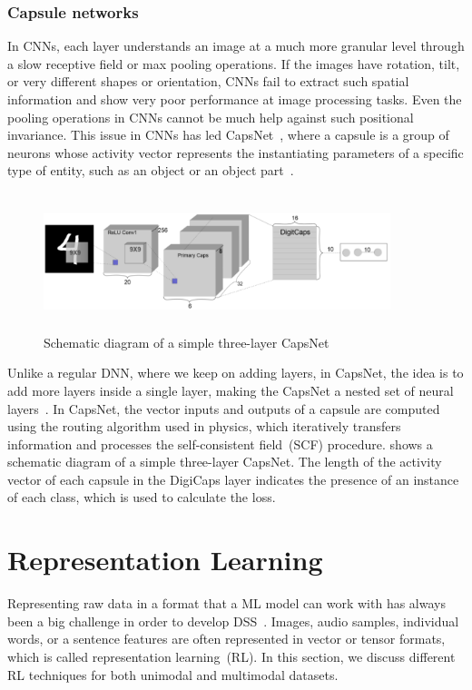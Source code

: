 \subsubsection{Capsule networks}
In CNNs, each layer understands an image at a much more granular level through a slow receptive field or max pooling operations. If the images have rotation, tilt, or very different shapes or orientation, CNNs fail to extract such spatial information and show very poor performance at image processing tasks. Even the pooling operations in CNNs cannot be much help against such positional invariance. This issue in CNNs has led CapsNet~\cite{CapsNet}, where a capsule is a group of neurons whose activity vector represents the instantiating parameters of a specific type of entity, such as an object or an object part~\cite{CapsNet}.

\begin{figure}[h]
    \centering
    \includegraphics[width=0.9\textwidth,height=40mm]{images/capsnet.png}
    \caption{Schematic diagram of a simple three-layer CapsNet~\cite{karimDLTF2018}}
    \label{fig:capsnet}
\end{figure}

\hspace*{3.5mm} Unlike a regular DNN, where we keep on adding layers, in CapsNet, the idea is to add more layers inside a single layer, making the CapsNet a nested set of neural layers~\cite{CapsNet}. In CapsNet, the vector inputs and outputs of a capsule are computed using the routing algorithm used in physics, which iteratively transfers information and processes the self-consistent field~(SCF) procedure.  shows a schematic diagram of a simple three-layer CapsNet. The length of the activity vector of each capsule in the DigiCaps layer indicates the presence of an instance of each class, which is used to calculate the loss. 

\section{Representation Learning}
\label{sec:rep_learn} 
Representing raw data in a format that a ML model can work with has always been a big challenge in order to develop DSS~\cite{mmsurvey}. Images, audio samples, individual words, or a sentence features are often represented in vector or tensor formats, which is called representation learning~(RL). In this section, we discuss different RL techniques for both unimodal and multimodal datasets. 

